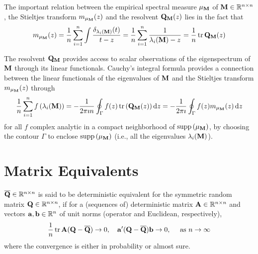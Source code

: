\begin{remark}
	The important relation between the empirical spectral measure $\mu_{{\bf M}}$ of ${\bf M}\in{\mathbb R}^{n\times n}$, the Stieltjes transform $m_{\mu_{{\bf M}}}(z)$ and the resolvent ${\bf Q}_{{\bf M}}(z)$ lies in the fact that
	\begin{equation} \label{eq:relation-between-empirical-spectral-measures-stieltjes-transform-and-its-resolvent}
		m_{\mu_{{\bf M}}}(z)=\frac{1}{n}\sum_{i=1}^{n}\int\frac{\delta_{\lambda_{i}({\bf M})}(t)}{t-z}=\frac{1}{n}\sum_{i=1}^{n}\frac{1}{\lambda_{i}({\bf M})-z}=\frac{1}{n}\operatorname{tr}{\bf Q}_{{\bf M}}(z)
	\end{equation}
\end{remark}

The resolvent ${\bf Q}_{{\bf M}}$ provides access to scalar observations of the eigenspectrum of ${\bf M}$ through its linear functionals. Cauchy's integral formula provides a connection between the linear functionals of the eigenvalues of ${\bf M}$ and the Stieltjes transform $m_{\mu_{{\bf M}}}(z)$ through
\begin{equation}
	\frac{1}{n}\sum_{i=1}^{n}f\left(\lambda_{i}({\bf M})\right)=-\frac{1}{2\pi\imath n}\oint_{\Gamma}f(z)\operatorname{tr}\left({\bf Q}_{{\bf M}}(z)\right)\mathop{}\!\mathrm{d} z=-\frac{1}{2\pi\imath }\oint_{\Gamma}f(z)m_{\mu_{{\bf M}}}(z)\mathop{}\!\mathrm{d} z
\end{equation}
for all $f$ complex analytic in a compact neighborhood of $\operatorname{supp}\left(\mu_{{\bf M}}\right)$, by choosing the contour $\Gamma$ to enclose $\operatorname{supp}\left(\mu_{{\bf M}}\right)$ (i.e., all the eigenvalues $\lambda_{i}({\bf M})$).

\section{Matrix Equivalents}

\begin{definition}
	$\overline{{\bf Q}}\in{\mathbb R}^{n\times n}$ is said to be deterministic equivalent for the symmetric random matrix ${\bf Q}\in{\mathbb R}^{n\times n}$, if for a (sequences of) deterministic matrix ${\bf A}\in{\mathbb R}^{n\times n}$ and vectors ${\bf a},{\bf b}\in{\mathbb R}^{n}$ of unit norms (operator and Euclidean, respectively),
	\begin{equation}
		\frac{1}{n}\operatorname{tr}{\bf A}({\bf Q}-\overline{{\bf Q}})\rightarrow 0,\quad{\bf a}^{\prime}({\bf Q}-\overline{{\bf Q}}){\bf b}\rightarrow 0,\quad\text{ as }n\rightarrow\infty
	\end{equation}
	where the convergence is either in probability or almost sure.
\end{definition}

